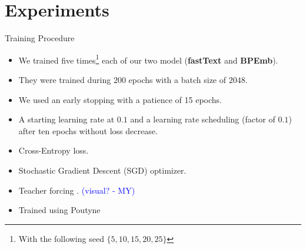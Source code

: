 \documentclass{beamer}
\newcommand{\marouane}[1]{\textcolor{blue}{(#1 - MY)}}
\begin{document}
	\section{Experiments}
	\begin{frame}{Training Procedure}
		\begin{itemize}
			\item<1-> We trained five times\footnote{With the following seed $\{5, 10, 15, 20, 25\}$} each of our two model (\textbf{fastText} and \textbf{BPEmb}).
			\item<2-> They were trained during $200$ epochs with a batch size of $2048$.
			\item<3-> We used an early stopping with a patience of 15 epochs.
			\item<4-> A starting learning rate at $0.1$ and a learning rate scheduling (factor of $0.1$) after ten epochs without loss decrease. 
			\item<5-> Cross-Entropy loss.
			\item<6-> Stochastic Gradient Descent (SGD) optimizer.
			\item<7-> Teacher forcing \cite{6795228}. \marouane{visual?}
			\item<8-> Trained using Poutyne \cite{poutyne} 
		\end{itemize}
	\end{frame}
	
\end{document}
